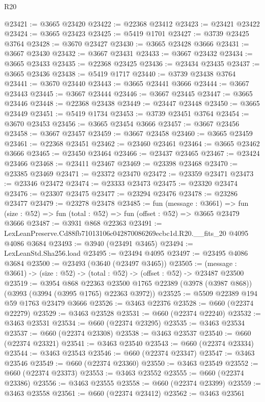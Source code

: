 \begin{lexlean}{R20}
\begin{coremodule}
@23421 := @3665 @23420
@23422 := @22368 @23412
@23423 := @23421 @23422
@23424 := @3665 @23423
@23425 := @5419 @1701
@23427 := @3739 @23425 @3764
@23428 := @3670 @23427
@23430 := @3665 @23428 @3666
@23431 := @3667 @23430
@23432 := @3667 @23431
@23433 := @3667 @23432
@23434 := @3665 @23433
@23435 := @22368 @23425
@23436 := @23434 @23435
@23437 := @3665 @23436
@23438 := @5419 @1717
@23440 := @3739 @23438 @3764
@23441 := @3670 @23440
@23443 := @3665 @23441 @3666
@23444 := @3667 @23443
@23445 := @3667 @23444
@23446 := @3667 @23445
@23447 := @3665 @23446
@23448 := @22368 @23438
@23449 := @23447 @23448
@23450 := @3665 @23449
@23451 := @5419 @1734
@23453 := @3739 @23451 @3764
@23454 := @3670 @23453
@23456 := @3665 @23454 @3666
@23457 := @3667 @23456
@23458 := @3667 @23457
@23459 := @3667 @23458
@23460 := @3665 @23459
@23461 := @22368 @23451
@23462 := @23460 @23461
@23464 := @3665 @23462 @3666
@23465 := @23450 @23464
@23466 := @23437 @23465
@23467 := @23424 @23466
@23468 := @23411 @23467
@23469 := @23398 @23468
@23470 := @23385 @23469
@23471 := @23372 @23470
@23472 := @23359 @23471
@23473 := @23346 @23472
@23474 := @23333 @23473
@23475 := @23320 @23474
@23476 := @23307 @23475
@23477 := @23294 @23476
@23478 := @23286 @23477
@23479 := @23278 @23478
@23485 := fun (message : @3661) =>
  fun (size : @52) => fun (total : @52) => fun (offset : @52) => @3665 @23479 @3666
@23487 := @3931 @868 @22363
@23491 := LexLeanPreserve.Cd88fb71013106c042870086269ecbc1d.R20.__fits_20 @4095 @4086 @3684
@23493 := @3940 (@23491 @3465)
@23494 := LexLeanStd.Sha256.load
@23495 := @23494 @4095
@23497 := @23495 @4086 @3684
@23500 := @23493 (@3640 (@23497 @3465))
@23505 := (message : @3661) -> (size : @52) -> (total : @52) -> (offset : @52) -> @23487 @23500
@23519 := @3954
    @868
    @22363
    @23500
    @1765
    @22389
    (@3978 (@3987 @868))
    (@3993 (@3994 (@3995 @1765) @22363 @3972))
@23525 := @5509 @22389 @194 @59 @1763 @23479 @3666
@23526 := @3463 @22376
@23528 := @660 (@22374 @22279)
@23529 := @3463 @23528
@23531 := @660 (@22374 @22240)
@23532 := @3463 @23531
@23534 := @660 (@22374 @23295)
@23535 := @3463 @23534
@23537 := @660 (@22374 @23308)
@23538 := @3463 @23537
@23540 := @660 (@22374 @23321)
@23541 := @3463 @23540
@23543 := @660 (@22374 @23334)
@23544 := @3463 @23543
@23546 := @660 (@22374 @23347)
@23547 := @3463 @23546
@23549 := @660 (@22374 @23360)
@23550 := @3463 @23549
@23552 := @660 (@22374 @23373)
@23553 := @3463 @23552
@23555 := @660 (@22374 @23386)
@23556 := @3463 @23555
@23558 := @660 (@22374 @23399)
@23559 := @3463 @23558
@23561 := @660 (@22374 @23412)
@23562 := @3463 @23561

\end{coremodule}
\end{lexlean}
